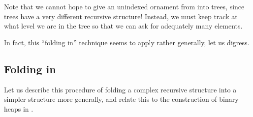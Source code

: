 \documentclass[Main.tex]{subfiles}
\begin{document}
Note that we cannot hope to give an unindexed ornament from \bL{} into trees, since trees have a very different recursive structure! Instead, we must keep track at what level we are in the tree so that we can ask for adequately many elements. 

In fact, this ``folding in'' technique seems to apply rather generally, let us digress.

\subsection{Folding in}
Let us describe this procedure of folding a complex recursive structure into a simpler structure more generally, and relate this to the construction of binary heaps in \cite{progorn}.
\end{document}
